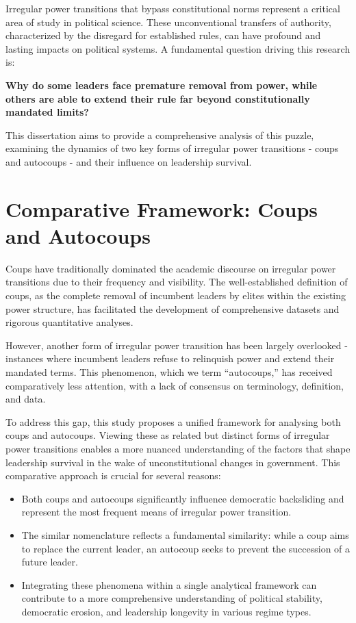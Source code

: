 \documentclass[
  12pt,
]{report}
\providecommand{\tightlist}{%
  \setlength{\itemsep}{0pt}\setlength{\parskip}{0pt}}\usepackage{longtable,booktabs,array}
\begin{document}
Irregular power transitions that bypass constitutional norms represent a
critical area of study in political science. These unconventional
transfers of authority, characterized by the disregard for established
rules, can have profound and lasting impacts on political systems. A
fundamental question driving this research is:

\textbf{Why do some leaders face premature removal from power, while
others are able to extend their rule far beyond constitutionally
mandated limits?}

This dissertation aims to provide a comprehensive analysis of this
puzzle, examining the dynamics of two key forms of irregular power
transitions - coups and autocoups - and their influence on leadership
survival.

\section{Comparative Framework: Coups and
Autocoups}\label{comparative-framework-coups-and-autocoups}

Coups have traditionally dominated the academic discourse on irregular
power transitions due to their frequency and visibility. The
well-established definition of coups, as the complete removal of
incumbent leaders by elites within the existing power structure, has
facilitated the development of comprehensive datasets and rigorous
quantitative analyses.

However, another form of irregular power transition has been largely
overlooked - instances where incumbent leaders refuse to relinquish
power and extend their mandated terms. This phenomenon, which we term
``autocoups,'' has received comparatively less attention, with a lack of
consensus on terminology, definition, and data.

To address this gap, this study proposes a unified framework for
analysing both coups and autocoups. Viewing these as related but
distinct forms of irregular power transitions enables a more nuanced
understanding of the factors that shape leadership survival in the wake
of unconstitutional changes in government. This comparative approach is
crucial for several reasons:

\begin{itemize}
\tightlist
\item
  Both coups and autocoups significantly influence democratic
  backsliding and represent the most frequent means of irregular power
  transition.
\item
  The similar nomenclature reflects a fundamental similarity: while a
  coup aims to replace the current leader, an autocoup seeks to prevent
  the succession of a future leader.
\item
  Integrating these phenomena within a single analytical framework can
  contribute to a more comprehensive understanding of political
  stability, democratic erosion, and leadership longevity in various
  regime types.
\end{itemize}
\end{document}

